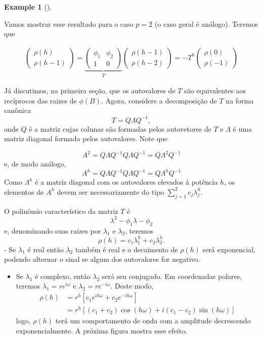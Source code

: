 \documentclass[
  letterpaper,
  DIV=11,
  numbers=noendperiod]{scrartcl}
\providecommand{\tightlist}{%
  \setlength{\itemsep}{0pt}\setlength{\parskip}{0pt}}\usepackage{longtable,booktabs,array}
\theoremstyle{plain}
\theoremstyle{plain}
\theoremstyle{definition}
\newtheorem{example}{Example}[chapter]
\theoremstyle{definition}
\theoremstyle{remark}
\begin{document}
\begin{example}[]\protect\hypertarget{exm-}{}\label{exm-}

Vamos mostrar esse resultado para o caso \(p=2\) (o caso geral é
análogo). Teremos que

\[\begin{align}
\left(\begin{array}{c}\rho(h)\\ \rho(h-1)\end{array}\right)=\underbrace{\left(\begin{array}{cc}\phi_1 & \phi_2 \\ 1 & 0 \end{array}\right)}_{T}\left(\begin{array}{c}\rho(h-1)\\ \rho(h-2)\end{array}\right)=\cdots T^h\left(\begin{array}{c}\rho(0)\\ \rho(-1)\end{array}\right)\end{align}\]

Já discutimos, na primeira seção, que os autovalores de \(T\) são
equivalentes aos recíprocos das raizes de \(\phi(B)\). Agora, considere
a decomposição de \(T\) na forma canônica \[T=Q\Lambda Q^{-1},\] onde
\(Q\) é a matriz cujas colunas são formadas pelos autovetores de \(T\) e
\(\Lambda\) é uma matriz diagonal formada pelos autovalores. Note que

\[A^2=Q\Lambda Q^{-1}Q\Lambda Q^{-1}=Q\Lambda^2 Q^{-1}\] e, de modo
análogo, \[A^h=Q\Lambda Q^{-1}Q\Lambda Q^{-1}=Q\Lambda^h Q^{-1}\] Como
\(\Lambda^h\) é a matriz diagonal com os autovalores elevados à potência
\(h\), os elementos de \(A^h\) devem ser necessariamente do tipo
\(\sum_{j=1}^2 c_j \lambda_j^h\).

O polinômio característico da matriz \(T\) é
\[\lambda^2-\phi_1\lambda-\phi_2\] e, denominando suas raizes por
\(\lambda_1\) e \(\lambda_2\), teremos
\[\rho(h)=c_1\lambda_1^h+c_2\lambda_2^h.\] - Se \(\lambda_1\) é real
então \(\lambda_2\) também é real e o decaimento de \(\rho(h)\) será
exponencial, podendo alternar o sinal se algum dos autovalores for
negativo.

\begin{itemize}
\tightlist
\item
  Se \(\lambda_1\) é complexo, então \(\lambda_2\) será seu conjugado.
  Em coordenadas polares, teremos \(\lambda_1=re^{i\omega}\) e
  \(\lambda_2=re^{-i\omega}\). Deste modo,
  \[\begin{align}\rho(h)&=r^h [c_1e^{ih\omega}+c_2e^{-ih\omega}]\\&=r^h[(c_1+c_2)\cos(h\omega)+i(c_1-c_2)\sin(h\omega)]\end{align}\]
  logo, \(\rho(h)\) terá um comportamento de onda com a amplitude
  decrescendo exponencialmente. A próxima figura mostra esse efeito.
\end{itemize}


\end{example}
\end{document}
